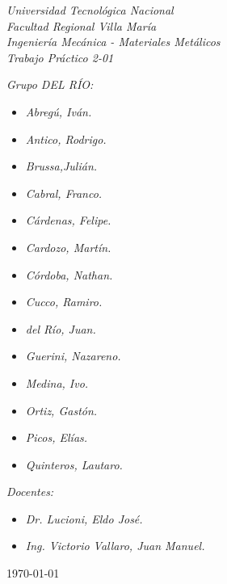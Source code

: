 \begin{titlepage}
	
	\begin{center}
		{\huge \textit{Universidad Tecnológica Nacional}}\\
        \vspace{0.5cm}
		{\LARGE \textit{Facultad Regional Villa María}}\\
		\vspace{1.5cm}
        {\LARGE{\textit{Ingeniería Mecánica - Materiales Metálicos}}}\\
		\vspace{1.5cm}
        \LARGE{\textit{Trabajo Práctico 2-01}}
	\end{center}
	
	\vfill

    \textit{Grupo DEL RÍO:}
	\begin{itemize}
		\item \textit{Abregú, Iván.}
		\item \textit{Antico, Rodrigo.}
		\item \textit{Brussa,Julián.}
		\item \textit{Cabral, Franco.}
        \item \textit{Cárdenas, Felipe.}
        \item \textit{Cardozo, Martín.}
        \item \textit{Córdoba, Nathan.}
        \item \textit{Cucco, Ramiro.}
        \item \textit{del Río, Juan.}
        \item \textit{Guerini, Nazareno.}
        \item \textit{Medina, Ivo.}
        \item \textit{Ortiz, Gastón.}
        \item \textit{Picos, Elías.}
        \item \textit{Quinteros, Lautaro.}
	\end{itemize}
    
	\textit{Docentes:}
	\begin{itemize}
		\item \textit{Dr. Lucioni, Eldo José.}
		\item \textit{Ing. Victorio Vallaro, Juan Manuel.}
	\end{itemize}
	\centering
	\today
	
\end{titlepage}